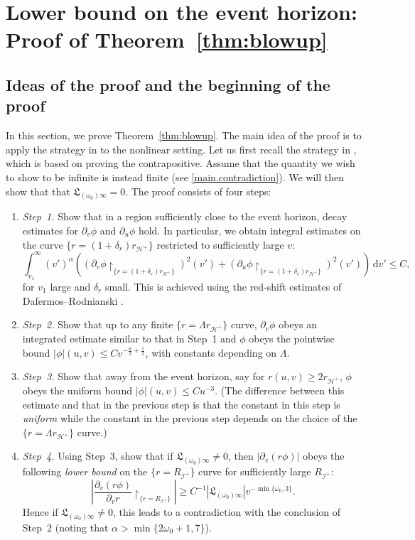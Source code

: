\documentclass[10pt, reqno]{amsart}
\theoremstyle{definition}
\theoremstyle{remark}
\theoremstyle{conjecture}
\numberwithin{equation}{section}
\newcommand{\ud}{\mathrm{d}}
\newcommand{\rd}{\partial}
\newcommand{\0}{\emptyset}
\newcommand{\alp}{\alpha}
\newcommand{\omg}{\omega}
\newcommand{\calH}{\mathcal H}
\newcommand{\calI}{\mathcal I}
\newcommand{\f}{\frac}
\newcommand{\de}{\delta}
\newcommand{\EH}{\calH^{+}}
\newcommand{\pfstep}[1]{\vspace{.5em} {\it \noindent #1.}}
\begin{document}
\section{Lower bound on the event horizon: Proof of Theorem~\ref{thm:blowup}} \label{sec:blowup}
\subsection{Ideas of the proof and the beginning of the proof}\label{sec:blowup:ideas}

In this section, we prove Theorem~\ref{thm:blowup}. The main idea of the proof is to apply the strategy in \cite{LO.instab} to the nonlinear setting. Let us first recall the strategy in \cite{LO.instab}, which is based on proving the contrapositive. Assume that the quantity we wish to show to be infinite is instead finite (see \eqref{main.contradiction}). We will then show that that $\mathfrak L_{(\omg_0)\infty}=0$. The proof consists of four steps:
\begin{enumerate}
\item \pfstep{Step~1} Show that in a region sufficiently close to the event horizon, decay estimates for $\rd_v\phi$ and $\rd_u\phi$ hold. In particular, we obtain integral estimates on the curve $\{r=(1+\de_r) r_{\EH}\}$ restricted to sufficiently large $v$:
$$\int_{v_1}^\infty (v')^{\alp}\left((\rd_v\phi\restriction_{\{r=(1+{\de_r}) r_{\EH}\}})^2(v')+(\rd_u\phi\restriction_{\{r=(1+{\de_r}) r_{\EH}\}})^2(v')\right)\, \ud v' \leq C,$$
for $v_1$ large and ${\de_r}$ small. This is achieved using the red-shift estimates of Dafermos--Rodnianski \cite{DRPL, DRS}.
\item \pfstep{Step~2} Show that up to any finite $\{r=\Lambda r_{\EH}\}$ curve, $\rd_v\phi$ obeys an integrated estimate similar to that in Step~1 and $\phi$ obeys the pointwise bound $|\phi|(u,v)\leq C v^{-\f{\alp}{2}+\f 12}$, with constants depending on $\Lambda$.
\item \pfstep{Step~3} Show that away from the event horizon, say for $r(u,v) \geq 2r_{\EH}$, $\phi$ obeys the uniform bound $|\phi|(u,v) \leq C u^{-3}$. (The difference between this estimate and that in the previous step is that the constant in this step is \emph{uniform} while the constant in the previous step depends on the choice of the $\{r=\Lambda r_{\EH}\}$ curve.)
\item \pfstep{Step~4} Using Step~3, show that if $\mathfrak L_{(\omg_0)\infty}\neq 0$, then $|\rd_v(r\phi)|$ obeys the following \emph{lower bound} on the $\{r=R_{\calI^+}\}$ curve for sufficiently large $R_{\calI^+}$:
$$\left|\f{\rd_v(r\phi)}{\rd_v r}\restriction_{\{r=R_{\calI^+}\}}\right| \geq C^{-1} \left|\mathfrak L_{(\omg_0)\infty}\right|v^{-\min\{\omg_0,3\}}.$$
Hence if $\mathfrak L_{(\omg_0)\infty}\neq 0$, this leads to a contradiction with the conclusion of Step~2 (noting that $\alp>\min\{2\omg_0+1, 7\}$).
\end{enumerate}
\end{document}
